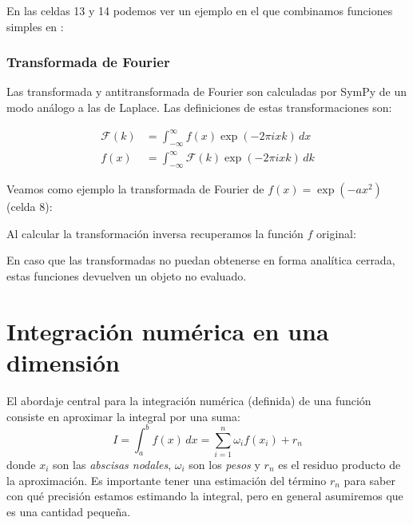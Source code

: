 En las celdas 13 y 14 podemos ver un ejemplo en el que combinamos funciones simples en :


\subsubsection{Transformada de Fourier}
Las transformada y antitransformada de Fourier son calculadas por SymPy de un modo análogo a las de Laplace. Las definiciones de estas transformaciones son:

\begin{align}\label{eq:intti04}
\mathcal{F}(k) &= \int_{-\infty}^{\infty} f(x) \exp(-2 \pi i x k) \, dx \\
f(x) &= \int_{-\infty}^{\infty} \mathcal{F}(k) \exp(-2 \pi i x k) \, dk 
\end{align} 

Veamos como ejemplo la transformada de Fourier de $f(x) = \exp(-a x^2)$ (celda 8):

Al calcular la transformación inversa recuperamos la función $f$ original:

En caso que las transformadas no puedan obtenerse en forma analítica cerrada, estas funciones devuelven un objeto no evaluado.



\section{Integración numérica en una dimensión}
El abordaje central para la integración numérica (definida) de una función consiste en aproximar la integral por una suma:
\begin{equation}\label{eq:int02}
 I = \int_a^b f(x) \, dx = \sum_{i=1}^{n} {\omega_i f(x_i)} + r_n
\end{equation} 
donde $x_i$ son las \textit{abscisas nodales}, $\omega_i$ son los \textit{pesos} y $r_n$ es el residuo producto de la aproximación. Es importante tener una estimación del término $r_n$ para saber con qué precisión estamos estimando la integral, pero en general asumiremos que es una cantidad pequeña.

